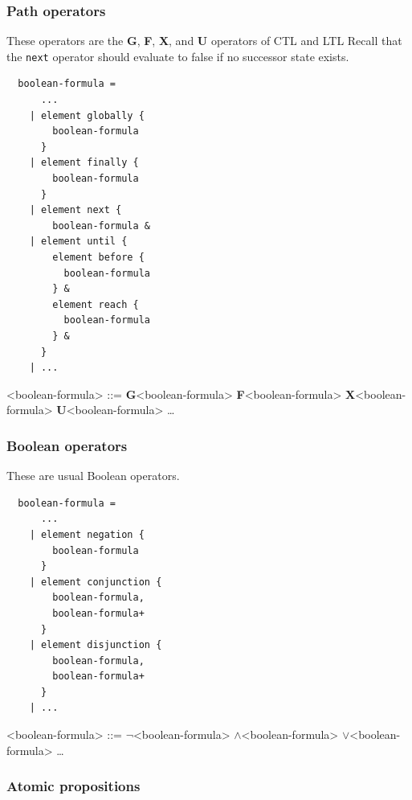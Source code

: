 \documentclass[10pt,english,a4paper]{article}
\newcommand\ltlf             {\textbf{F}\xspace}
\newcommand\ltlg             {\textbf{G}\xspace}
\newcommand\ltlx             {\textbf{X}\xspace}
\newcommand\ltlu             {\textbf{U}\xspace}
\newcommand\logicnot         {\boldmath$\lnot$\xspace}
\newcommand\logicand         {\boldmath$\land$\xspace}
\newcommand\logicor          {\boldmath$\lor$\xspace}
\begin{document}
\subsubsection{Path operators}

These operators are the
\ltlg,
\ltlf,
\ltlx, and
\ltlu
operators of CTL and LTL
Recall that the \lstinline!next! operator should evaluate to false if no
successor state exists.

\begin{multicols}{2}
\begin{lstlisting}
  boolean-formula =
      ...
    | element globally {
        boolean-formula
      }
    | element finally {
        boolean-formula
      }
    | element next {
        boolean-formula &
    | element until {
        element before {
          boolean-formula
        } &
        element reach {
          boolean-formula
        } &
      }
    | ...
\end{lstlisting}
\columnbreak
\setlength{\grammarindent}{10em}
\begin{grammar}
<boolean-formula> ::=
     \ltlg <boolean-formula>
\alt \ltlf <boolean-formula>
\alt \ltlx <boolean-formula>
 \ltlu <boolean-formula>
\alt \ldots
\end{grammar}
\end{multicols}

\subsubsection{Boolean operators}

These are usual Boolean operators.

\begin{multicols}{2}
\begin{lstlisting}
  boolean-formula =
      ...
    | element negation {
        boolean-formula
      }
    | element conjunction {
        boolean-formula,
        boolean-formula+
      }
    | element disjunction {
        boolean-formula,
        boolean-formula+
      }
    | ...
\end{lstlisting}
\columnbreak
\setlength{\grammarindent}{6em}
\begin{grammar}
<boolean-formula> ::=
     \logicnot <boolean-formula>
 \logicand <boolean-formula>
 \logicor <boolean-formula>
\alt \ldots
\end{grammar}
\end{multicols}


\subsubsection{Atomic propositions}
\end{document}
